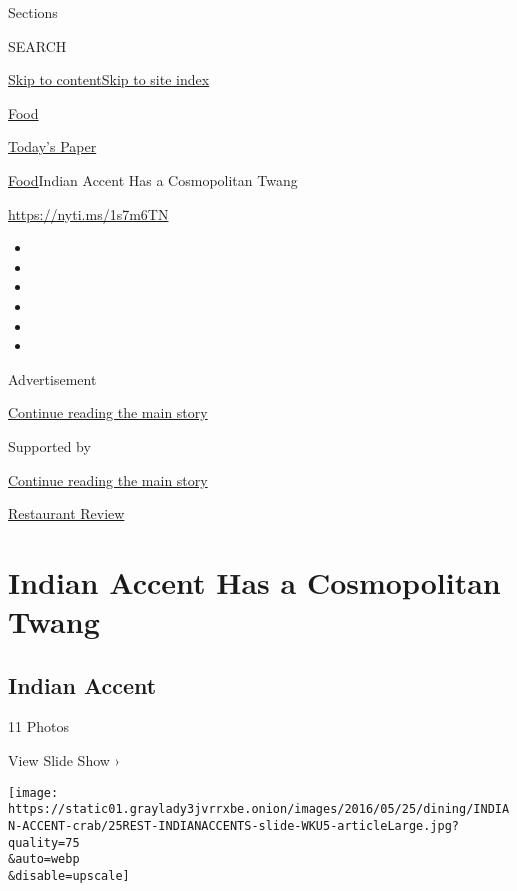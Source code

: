 Sections

SEARCH

\protect\hyperlink{site-content}{Skip to
content}\protect\hyperlink{site-index}{Skip to site index}

\href{https://www.nytimes3xbfgragh.onion/section/food}{Food}

\href{https://myaccount.nytimes3xbfgragh.onion/auth/login?response_type=cookie\&client_id=vi}{}

\href{https://www.nytimes3xbfgragh.onion/section/todayspaper}{Today's
Paper}

\href{/section/food}{Food}\textbar{}Indian Accent Has a Cosmopolitan
Twang

\url{https://nyti.ms/1s7m6TN}

\begin{itemize}
\item
\item
\item
\item
\item
\item
\end{itemize}

Advertisement

\protect\hyperlink{after-top}{Continue reading the main story}

Supported by

\protect\hyperlink{after-sponsor}{Continue reading the main story}

\href{/column/restaurant-review}{Restaurant Review}

\hypertarget{indian-accent-has-a-cosmopolitan-twang}{%
\section{Indian Accent Has a Cosmopolitan
Twang}\label{indian-accent-has-a-cosmopolitan-twang}}

\href{https://www.nytimes3xbfgragh.onion/slideshow/2016/05/25/dining/indian-accent-restaurant.html}{}

\hypertarget{indian-accent}{%
\subsection{Indian Accent}\label{indian-accent}}

11 Photos

View Slide Show ›

\texttt{[image: https://static01.graylady3jvrrxbe.onion/images/2016/05/25/dining/INDIAN-ACCENT-crab/25REST-INDIANACCENTS-slide-WKU5-articleLarge.jpg?quality=75\\\&auto=webp\\\&disable=upscale]}

